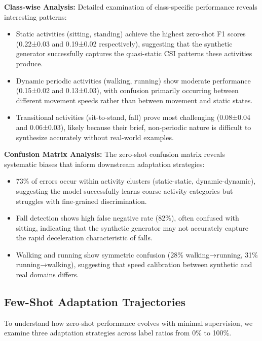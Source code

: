 \documentclass[journal]{IEEEtran}
\begin{document}
\textbf{Class-wise Analysis:} Detailed examination of class-specific performance reveals interesting patterns:
\begin{itemize}
\item Static activities (sitting, standing) achieve the highest zero-shot F1 scores (0.22±0.03 and 0.19±0.02 respectively), suggesting that the synthetic generator successfully captures the quasi-static CSI patterns these activities produce.
\item Dynamic periodic activities (walking, running) show moderate performance (0.15±0.02 and 0.13±0.03), with confusion primarily occurring between different movement speeds rather than between movement and static states.
\item Transitional activities (sit-to-stand, fall) prove most challenging (0.08±0.04 and 0.06±0.03), likely because their brief, non-periodic nature is difficult to synthesize accurately without real-world examples.
\end{itemize}

\textbf{Confusion Matrix Analysis:} The zero-shot confusion matrix reveals systematic biases that inform downstream adaptation strategies:
\begin{itemize}
\item 73\% of errors occur within activity clusters (static-static, dynamic-dynamic), suggesting the model successfully learns coarse activity categories but struggles with fine-grained discrimination.
\item Fall detection shows high false negative rate (82\%), often confused with sitting, indicating that the synthetic generator may not accurately capture the rapid deceleration characteristic of falls.
\item Walking and running show symmetric confusion (28\% walking→running, 31\% running→walking), suggesting that speed calibration between synthetic and real domains differs.
\end{itemize}

\subsection{Few-Shot Adaptation Trajectories}
To understand how zero-shot performance evolves with minimal supervision, we examine three adaptation strategies across label ratios from 0\% to 100\%.
\end{document}
